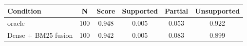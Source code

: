 \begin{tabular}{lccccc}
\toprule
Condition & N & Score & Supported & Partial & Unsupported \\
\midrule
oracle & 100 & 0.948 & 0.005 & 0.053 & 0.922 \\
Dense + BM25 fusion & 100 & 0.942 & 0.005 & 0.083 & 0.899 \\
\bottomrule
\end{tabular}

